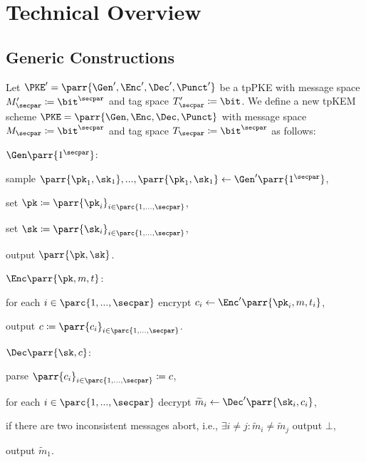 \section{Technical Overview}
\label{sec:overview}


\subsection{Generic Constructions}

\begin{construction}\label{con:sel-to-ad}
    Let \(\PKE' = \parr{\Gen',\Enc',\Dec',\Punct'}\) be a tpPKE with message space \(M'_\secpar \coloneqq \bit^\secpar\) and tag space \(T'_\secpar \coloneqq \bit\).
    We define a new tpKEM scheme \(\PKE = \parr{\Gen,\Enc,\Dec,\Punct}\) with message space \(M_\secpar \coloneqq \bit^\secpar\) and tag space \(T_\secpar \coloneqq \bit^\secpar\) as follows:
    \begin{sitemize}
        \item \(\Gen\parr{1^\secpar}\):
        \begin{sitemize}
            \item sample \(\parr{\pk_1,\sk_1}, ..., \parr{\pk_1,\sk_1} \gets \Gen'\parr{1^\secpar}\),
            \item set \(\pk \coloneqq \parr{\pk_i}_{i \in \parc{1,...,\secpar}}\),
            \item set \(\sk \coloneqq \parr{\sk_i}_{i \in \parc{1,...,\secpar}}\),
            \item output \(\parr{\pk,\sk}\).
        \end{sitemize}

        \item \(\Enc\parr{\pk,m,t}\):
        \begin{sitemize}
            \item for each \(i \in \parc{1,...,\secpar}\) encrypt \(c_i \gets \Enc'\parr{\pk_i,m,t_i}\),
            \item output \(c \coloneqq \parr{c_i}_{i \in \parc{1,...,\secpar}}\).
        \end{sitemize}

        \item \(\Dec\parr{\sk,c}\):
        \begin{sitemize}
            \item parse \(\parr{c_i}_{i \in \parc{1,...,\secpar}} \coloneqq c\),
            \item for each \(i \in \parc{1,...,\secpar}\) decrypt \(\widetilde{m}_i \gets \Dec'\parr{\sk_i,c_i}\),
            \item if there are two inconsistent messages abort, i.e., \(\exists i \neq j : \widetilde{m}_i \neq \widetilde{m}_j\) output \(\bot\),
            \item output \(\widetilde{m}_1\).
        \end{sitemize}


\end{sitemize}
\end{construction}
